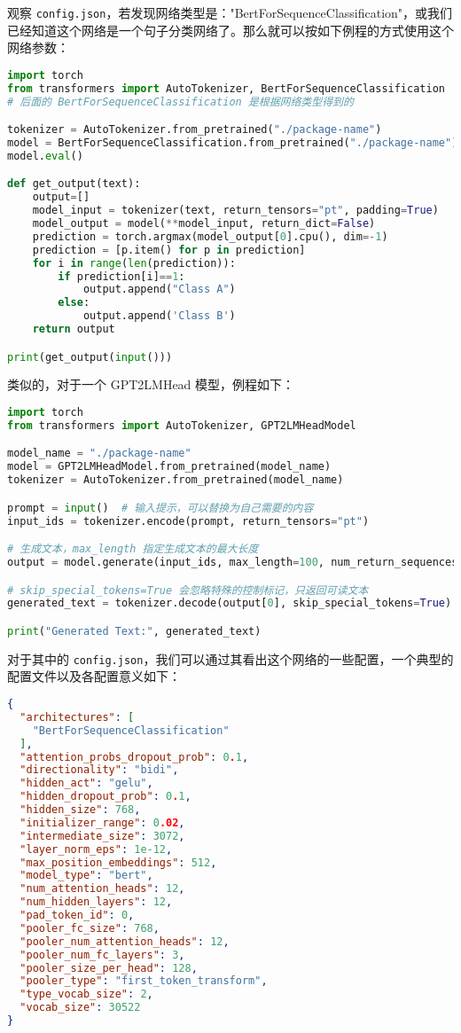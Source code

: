 观察 \verb`config.json`，若发现网络类型是："BertForSequenceClassification"，或我们已经知道这个网络是一个句子分类网络了。那么就可以按如下例程的方式使用这个网络参数：
\begin{lstlisting}[language=python]
import torch
from transformers import AutoTokenizer, BertForSequenceClassification 
# 后面的 BertForSequenceClassification 是根据网络类型得到的

tokenizer = AutoTokenizer.from_pretrained("./package-name")
model = BertForSequenceClassification.from_pretrained("./package-name")
model.eval()

def get_output(text):
    output=[]
    model_input = tokenizer(text, return_tensors="pt", padding=True)
    model_output = model(**model_input, return_dict=False)
    prediction = torch.argmax(model_output[0].cpu(), dim=-1)
    prediction = [p.item() for p in prediction]
    for i in range(len(prediction)):
        if prediction[i]==1:
            output.append("Class A")
        else:
            output.append('Class B')
    return output

print(get_output(input()))
\end{lstlisting}

类似的，对于一个 GPT2LMHead 模型，例程如下：
\begin{lstlisting}[language=python]
import torch
from transformers import AutoTokenizer, GPT2LMHeadModel

model_name = "./package-name"
model = GPT2LMHeadModel.from_pretrained(model_name)
tokenizer = AutoTokenizer.from_pretrained(model_name)

prompt = input()  # 输入提示，可以替换为自己需要的内容
input_ids = tokenizer.encode(prompt, return_tensors="pt")

# 生成文本，max_length 指定生成文本的最大长度
output = model.generate(input_ids, max_length=100, num_return_sequences=1, pad_token_id=tokenizer.eos_token_id)

# skip_special_tokens=True 会忽略特殊的控制标记，只返回可读文本
generated_text = tokenizer.decode(output[0], skip_special_tokens=True)

print("Generated Text:", generated_text)
\end{lstlisting}

对于其中的 \verb`config.json`，我们可以通过其看出这个网络的一些配置，一个典型的配置文件以及各配置意义如下：
\begin{lstlisting}[language=json]
{
  "architectures": [
    "BertForSequenceClassification"
  ],
  "attention_probs_dropout_prob": 0.1,
  "directionality": "bidi",
  "hidden_act": "gelu",
  "hidden_dropout_prob": 0.1,
  "hidden_size": 768,
  "initializer_range": 0.02,
  "intermediate_size": 3072,
  "layer_norm_eps": 1e-12,
  "max_position_embeddings": 512,
  "model_type": "bert",
  "num_attention_heads": 12,
  "num_hidden_layers": 12,
  "pad_token_id": 0,
  "pooler_fc_size": 768,
  "pooler_num_attention_heads": 12,
  "pooler_num_fc_layers": 3,
  "pooler_size_per_head": 128,
  "pooler_type": "first_token_transform",
  "type_vocab_size": 2,
  "vocab_size": 30522
}
\end{lstlisting}

